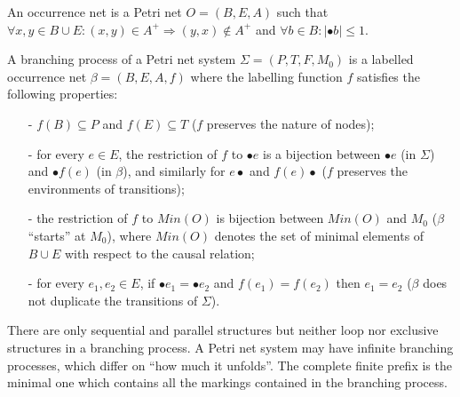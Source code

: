 \documentclass{llncs}
\begin{document}
\begin{definition}\label{def:occurrenceNet}
An occurrence net is a Petri net $O=(B,E,A)$ such that $\forall x,y\in B\cup E:(x,y)
\in A^{+}\Rightarrow(y,x)\notin A^{+}$ and $\forall b\in B:|\bullet b|\leq 1$.
\end{definition}

\begin{definition}\label{def:branchingProcess}
A branching process of a Petri net system $\Sigma=(P,T,F,M_{0})$ is a labelled occurrence net $\beta=(B,E,A,f)$ where the labelling function $f$ satisfies the following properties:
	\begin{itemize}
		\item[-] $f(B)\subseteq P$ and $f(E)\subseteq T$ ($f$ preserves the nature of nodes);
		\item[-] for every $e\in E$, the restriction of $f$ to $\bullet e$ is a bijection between $\bullet e$ (in $\Sigma$) and $\bullet f(e)$ (in $\beta$), and similarly for $e\bullet$ and $f(e)\bullet$ ($f$ preserves the environments of transitions);
		\item[-] the restriction of $f$ to $Min(O)$ is bijection between $Min(O)$ and $M_{0}$ ($\beta$ ``starts'' at $M_{0}$), where $Min(O)$ denotes the set of minimal elements of $B\cup E$ with respect to the causal relation;
		\item[-] for every $e_{1},e_{2}\in E$, if $\bullet e_{1}=\bullet e_{2}$ and $f(e_{1})=f(e_{2})$ then $e_{1}=e_{2}$ ($\beta$ does not duplicate the transitions of $\Sigma$).
	\end{itemize}
\end{definition}

There are only sequential and parallel structures but neither loop nor exclusive structures in a branching process. A Petri net system may have infinite branching processes, which differ on ``how much it unfolds''. The complete finite prefix is the minimal one which contains all the markings contained in the branching process.
\end{document}
